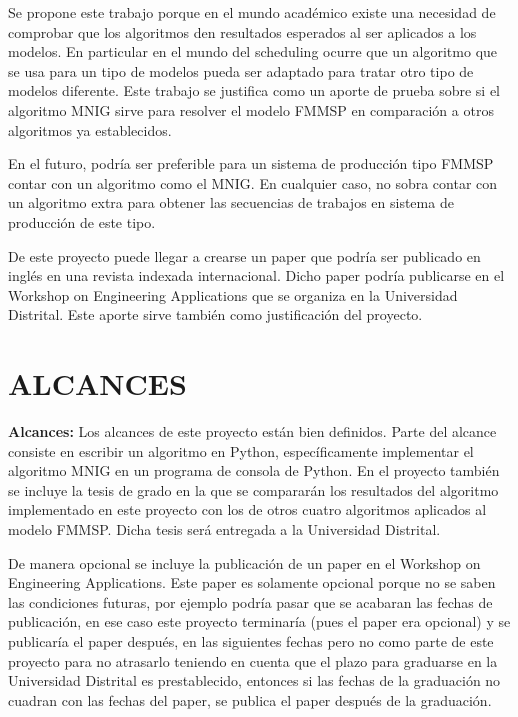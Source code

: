 \documentclass{article}
\begin{document}
Se propone este trabajo porque en el mundo académico existe una necesidad de
comprobar que los algoritmos den resultados esperados al ser aplicados a los
modelos. En particular en el mundo
del scheduling ocurre que un algoritmo que se usa para un tipo de modelos pueda
ser adaptado para tratar otro tipo de modelos diferente. Este trabajo se
justifica como un aporte de prueba sobre si el algoritmo MNIG sirve para
resolver el modelo FMMSP en comparación a otros algoritmos ya establecidos.

\vspace{\baselineskip}
En el futuro, podría ser preferible para un sistema de producción tipo
\linebreak FMMSP
contar con un algoritmo como el MNIG. En cualquier caso, no sobra contar con
un algoritmo extra para obtener las secuencias de trabajos en sistema de
producción de este tipo.

\vspace{\baselineskip}
De este proyecto puede llegar a crearse un paper que podría ser publicado
en inglés en una revista indexada internacional. Dicho paper podría 
publicarse en el Workshop on Engineering Applications que se organiza en
la Universidad Distrital. Este aporte sirve también como justificación del 
proyecto.

\section{ALCANCES}

\textbf{Alcances:} Los alcances de este proyecto están bien definidos. Parte 
del alcance consiste en escribir un algoritmo en Python, específicamente
implementar el algoritmo MNIG en un programa de consola de Python. En el 
proyecto también se incluye la tesis de grado en la que se compararán
los resultados del algoritmo implementado en este proyecto con los de otros
cuatro algoritmos aplicados al modelo FMMSP. Dicha tesis será entregada a la
Universidad Distrital.

\vspace{\baselineskip}
De manera opcional se incluye la publicación de un paper en el Workshop on
Engineering Applications. Este paper es solamente opcional porque no se saben
las condiciones futuras, por ejemplo podría pasar que se acabaran las fechas
de publicación, en ese caso este proyecto terminaría (pues el paper era 
opcional) y se publicaría el paper después, en las siguientes fechas pero no
como parte de este proyecto para no atrasarlo teniendo en cuenta que el plazo
para graduarse en la Universidad Distrital es prestablecido, entonces si las
fechas de la graduación no cuadran con las fechas del paper, se publica el 
paper después de la graduación.
\end{document}
